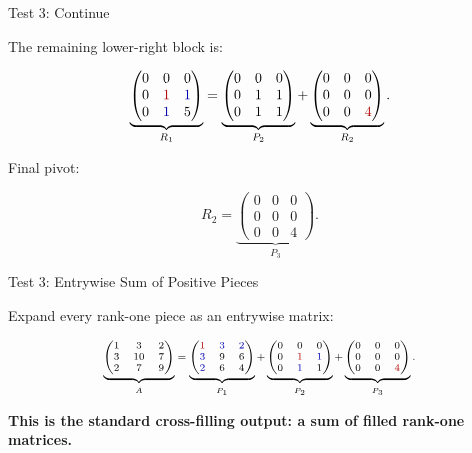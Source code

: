 \documentclass[10pt]{beamer}
\theoremstyle{definition}
\newcommand{\x}[1]{\alert{\textbf{#1}}}
\newcommand{\rd}[1]{{\color{red!70!black}#1}}
\newcommand{\bl}[1]{{\color{blue!70!black}#1}}
\begin{document}
\begin{frame}{Test 3: Continue}

The remaining lower-right block is:

\[
\underbrace{
\begin{pmatrix}
0&0&0\\
0&\rd{1}&\bl{1}\\
0&\bl{1}&5
\end{pmatrix}}_{R_1}
=
\underbrace{
\begin{pmatrix}
0&0&0\\
0&1&1\\
0&1&1
\end{pmatrix}}_{P_2}
+
\underbrace{
\begin{pmatrix}
0&0&0\\
0&0&0\\
0&0&\rd{4}
\end{pmatrix}}_{R_2}.
\]

\vfill

Final pivot:

$$
R_2=
\underbrace{
\begin{pmatrix}
0&0&0\\
0&0&0\\
0&0&4
\end{pmatrix}}_{P_3}.
$$

\end{frame}


\begin{frame}{Test 3: Entrywise Sum of Positive Pieces}

Expand every rank-one piece as an entrywise matrix:

\[
\scriptsize
\begin{aligned}
\underbrace{
\begin{pmatrix}
1&3&2\\
3&10&7\\
2&7&9
\end{pmatrix}}_{A}
=
\underbrace{
\begin{pmatrix}
\rd{1}&\bl{3}&\bl{2}\\
\bl{3}&9&6\\
\bl{2}&6&4
\end{pmatrix}}_{P_1}
+
\underbrace{
\begin{pmatrix}
0&0&0\\
0&\rd{1}&\bl{1}\\
0&\bl{1}&1
\end{pmatrix}}_{P_2}
+
\underbrace{
\begin{pmatrix}
0&0&0\\
0&0&0\\
0&0&\rd{4}
\end{pmatrix}}_{P_3}.
\end{aligned}
\]

\vfill

\begin{center}
\x{This is the standard cross-filling output: a sum of filled rank-one matrices.}
\end{center}


\end{frame}
\end{document}
